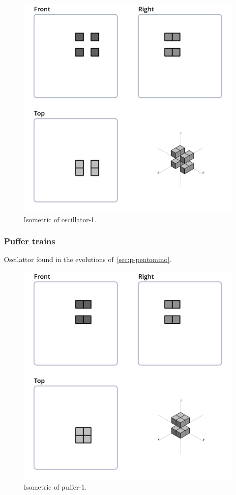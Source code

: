 \begin{figure}
	\centering
	\includegraphics[scale=0.3]{iso_settings/osc_1.png}
	\caption{Isometric of oscillator-1.}
  \label{fig:iso-osc-1}
\end{figure}

\subsubsection{Puffer trains}
Oscilattor found in the evolutions of~\ref{sec:p-pentomino}.

\begin{figure}
	\centering
	\includegraphics[scale=0.3]{iso_settings/puffer_1.png}
	\caption{Isometric of puffer-1.}
  \label{fig:iso-puffer-1}
\end{figure}
